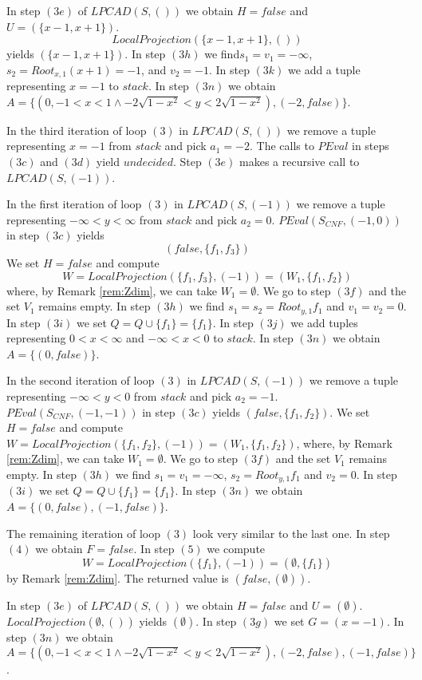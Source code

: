\documentclass[english]{amsart}
\numberwithin{equation}{section}
\numberwithin{figure}{section}
\begin{document}
In step $(3e)$ of $LPCAD(S,())$ we obtain $H=false$ and $U=(\{x-1,x+1\})$.
\[
LocalProjection(\{x-1,x+1\},())\]
yields $(\{x-1,x+1\})$. In step $(3h)$ we find$s_{1}=v_{1}=-\infty$,
$s_{2}=Root_{x,1}(x+1)=-1$, and $v_{2}=-1$. In step $(3k)$ we add
a tuple representing $x=-1$ to $stack$. In step $(3n)$ we obtain
$A=\{(0,-1<x<1\wedge-2\sqrt{1-x^{2}}<y<2\sqrt{1-x^{2}}),(-2,false)\}$.

In the third iteration of loop $(3)$ in $LPCAD(S,())$ we remove
a tuple representing $x=-1$ from $stack$ and pick $a_{1}=-2$. The
calls to $PEval$ in steps $(3c)$ and $(3d)$ yield $undecided$.
Step $(3e)$ makes a recursive call to $LPCAD(S,(-1))$.

In the first iteration of loop $(3)$ in $LPCAD(S,(-1))$ we remove
a tuple representing $-\infty<y<\infty$ from $stack$ and pick $a_{2}=0$.
$PEval(S_{CNF},(-1,0))$ in step $(3c)$ yields \[
(false,\{f_{1},f_{3}\})\]
We set $H=false$ and compute \[
W=LocalProjection(\{f_{1},f_{3}\},(-1))=(W_{1},\{f_{1},f_{2}\})\]
where, by Remark \ref{rem:Zdim}, we can take $W_{1}=\emptyset$.
We go to step $(3f)$ and the set $V_{1}$ remains empty. In step
$(3h)$ we find $s_{1}=s_{2}=Root_{y,1}f_{1}$ and $v_{1}=v_{2}=0$.
In step $(3i)$ we set $Q=Q\cup\{f_{1}\}=\{f_{1}\}$. In step $(3j)$
we add tuples representing $0<x<\infty$ and $-\infty<x<0$ to $stack$.
In step $(3n)$ we obtain $A=\{(0,false)\}$. 

In the second iteration of loop $(3)$ in $LPCAD(S,(-1))$ we remove
a tuple representing $-\infty<y<0$ from $stack$ and pick $a_{2}=-1$.
$PEval(S_{CNF},(-1,-1))$ in step $(3c)$ yields $(false,\{f_{1},f_{2}\})$.
We set $H=false$ and compute $W=LocalProjection(\{f_{1},f_{2}\},(-1))=(W_{1},\{f_{1},f_{2}\})$,
where, by Remark \ref{rem:Zdim}, we can take $W_{1}=\emptyset$.
We go to step $(3f)$ and the set $V_{1}$ remains empty. In step
$(3h)$ we find $s_{1}=v_{1}=-\infty$, $s_{2}=Root_{y,1}f_{1}$ and
$v_{2}=0$. In step $(3i)$ we set $Q=Q\cup\{f_{1}\}=\{f_{1}\}$.
In step $(3n)$ we obtain $A=\{(0,false),(-1,false)\}$. 

The remaining iteration of loop $(3)$ look very similar to the last
one. In step $(4)$ we obtain $F=false$. In step $(5)$ we compute
\[
W=LocalProjection(\{f_{1}\},(-1))=(\emptyset,\{f_{1}\})\]
by Remark \ref{rem:Zdim}. The returned value is $(false,(\emptyset))$.

In step $(3e)$ of $LPCAD(S,())$ we obtain $H=false$ and $U=(\emptyset)$.
$LocalProjection(\emptyset,())$ yields $(\emptyset)$. In step $(3g)$
we set $G=(x=-1)$. In step $(3n)$ we obtain $A=\{(0,-1<x<1\wedge-2\sqrt{1-x^{2}}<y<2\sqrt{1-x^{2}}),(-2,false),(-1,false)\}$.
\end{document}
